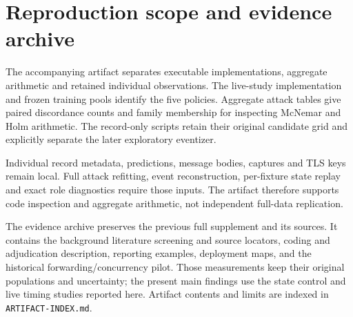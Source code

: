 \section{Reproduction scope and evidence archive}
The accompanying artifact separates executable implementations, aggregate arithmetic and retained individual observations. The live-study implementation and frozen training pools identify the five policies. Aggregate attack tables give paired discordance counts and family membership for inspecting McNemar and Holm arithmetic. The record-only scripts retain their original candidate grid and explicitly separate the later exploratory eventizer.

Individual record metadata, predictions, message bodies, captures and TLS keys remain local. Full attack refitting, event reconstruction, per-fixture state replay and exact role diagnostics require those inputs. The artifact therefore supports code inspection and aggregate arithmetic, not independent full-data replication.

The evidence archive preserves the previous full supplement and its sources. It contains the background literature screening and source locators, coding and adjudication description, reporting examples, deployment maps, and the historical forwarding/concurrency pilot. Those measurements keep their original populations and uncertainty; the present main findings use the state control and live timing studies reported here. Artifact contents and limits are indexed in \texttt{ARTIFACT-INDEX.md}.
